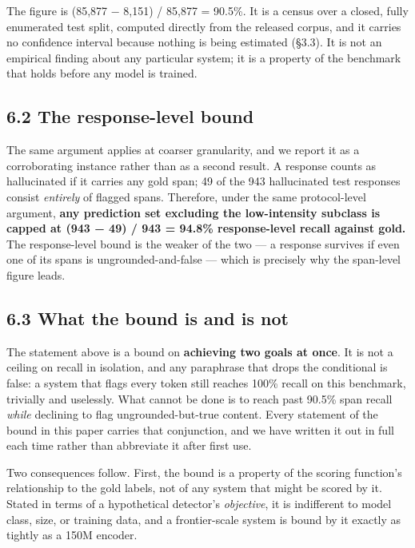 \documentclass[11pt]{article}
\begin{document}
The figure is (85,877 − 8,151) / 85,877 = 90.5\%. It is a census over a closed, fully
enumerated test split, computed directly from the released corpus, and it carries no
confidence interval because nothing is being estimated (§3.3). It is not an empirical
finding about any particular system; it is a property of the benchmark that holds before
any model is trained.

\subsection{6.2 The response-level bound}\label{the-response-level-bound}

The same argument applies at coarser granularity, and we report it as a corroborating
instance rather than as a second result. A response counts as hallucinated if it carries any
gold span; 49 of the 943 hallucinated test responses consist \emph{entirely} of flagged spans.
Therefore, under the same protocol-level argument, \textbf{any prediction set excluding the
low-intensity subclass is capped at (943 − 49) / 943 = 94.8\% response-level recall against
gold.} The response-level bound is the weaker of the two --- a response survives if even one
of its spans is ungrounded-and-false --- which is precisely why the span-level figure leads.

\subsection{6.3 What the bound is and is not}\label{what-the-bound-is-and-is-not}

The statement above is a bound on \textbf{achieving two goals at once}. It is not a ceiling on
recall in isolation, and any paraphrase that drops the conditional is false: a system that
flags every token still reaches 100\% recall on this benchmark, trivially and uselessly. What
cannot be done is to reach past 90.5\% span recall \emph{while} declining to flag
ungrounded-but-true content. Every statement of the bound in this paper carries that
conjunction, and we have written it out in full each time rather than abbreviate it after
first use.

Two consequences follow. First, the bound is a property of the scoring function's
relationship to the gold labels, not of any system that might be scored by it. Stated in
terms of a hypothetical detector's \emph{objective}, it is indifferent to model class, size, or
training data, and a frontier-scale system is bound by it exactly as tightly as a 150M
encoder.
\end{document}
